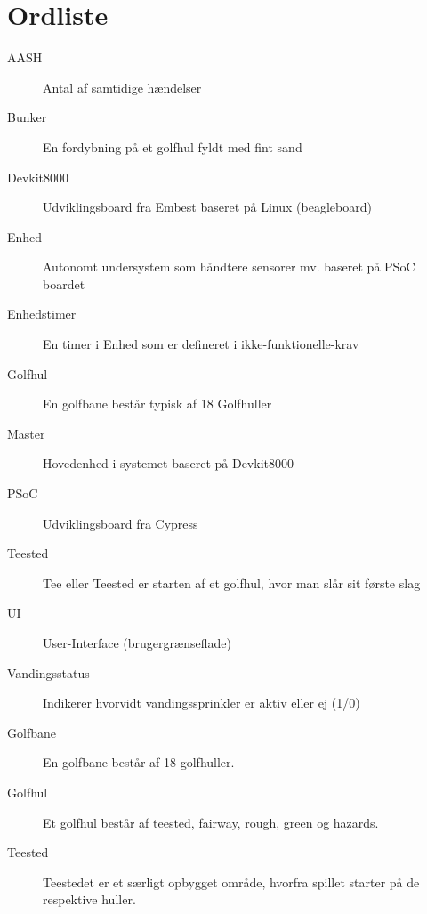 \chapter{Ordliste}


\begin{description}

\item[AASH] Antal af samtidige hændelser
\item[Bunker] En fordybning på et golfhul fyldt med fint sand
\item[Devkit8000] Udviklingsboard fra Embest baseret på Linux (beagleboard)
\item[Enhed] Autonomt undersystem som håndtere sensorer mv. baseret på PSoC boardet
\item[Enhedstimer] En timer i Enhed som er defineret i ikke-funktionelle-krav
\item[Golfhul] En golfbane består typisk af 18 Golfhuller 
\item[Master] Hovedenhed i systemet baseret på Devkit8000
\item[PSoC] Udviklingsboard fra Cypress
\item[Teested] Tee eller Teested er starten af et golfhul, hvor man slår sit første slag
\item[UI] User-Interface (brugergrænseflade)
\item[Vandingsstatus] Indikerer hvorvidt vandingssprinkler er aktiv eller ej (1/0)
\item[Golfbane] En golfbane består af 18 golfhuller.
\item[Golfhul] Et golfhul består af teested, fairway, rough, green og hazards. 
\item[Teested] Teestedet er et særligt opbygget område, hvorfra spillet starter på de respektive huller.

\end{description}